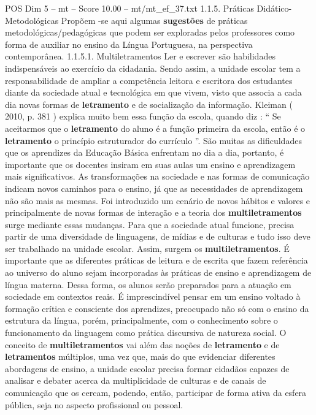 \begin{textsample}{POS Dim 5 – mt – Score 10.00 – mt/mt\_ef\_37.txt}  \label{ex:f5_pos_083}
1.1.5.
Práticas Didático-Metodológicas Propõem -se aqui algumas \textbf{sugestões} de práticas metodológicas/pedagógicas que podem ser exploradas pelos professores como forma de auxiliar no ensino da Língua Portuguesa, na perspectiva contemporânea. 1.1.5.1.
Multiletramentos Ler e escrever são habilidades indispensáveis ao exercício da cidadania.
Sendo assim, a unidade escolar tem a responsabilidade de ampliar a competência leitora e escritora dos estudantes diante da sociedade atual e tecnológica em que vivem, visto que associa a cada dia novas formas de \textbf{letramento} e de socialização da informação.
Kleiman ( 2010, p. 381 ) explica muito bem essa função da escola, quando diz : “ Se aceitarmos que o \textbf{letramento} do aluno é a função primeira da escola, então é o \textbf{letramento} o princípio estruturador do currículo ”.
São muitas as dificuldades que os aprendizes da Educação Básica enfrentam no dia a dia, portanto, é importante que os docentes insiram em suas aulas um ensino e aprendizagem mais significativos.
As transformações na sociedade e nas formas de comunicação indicam novos caminhos para o ensino, já que as necessidades de aprendizagem não são mais as mesmas.
Foi introduzido um cenário de novos hábitos e valores e principalmente de novas formas de interação e a teoria dos \textbf{multiletramentos} surge mediante essas mudanças.
Para que a sociedade atual funcione, precisa partir de uma diversidade de linguagens, de mídias e de culturas e tudo isso deve ser trabalhado na unidade escolar.
Assim, surgem os \textbf{multiletramentos}.
É importante que as diferentes práticas de leitura e de escrita que fazem referência ao universo do aluno sejam incorporadas às práticas de ensino e aprendizagem de língua materna.
Dessa forma, os alunos serão preparados para a atuação em sociedade em contextos reais.
É imprescindível pensar em um ensino voltado à formação crítica e consciente dos aprendizes, preocupado não só com o ensino da estrutura da língua, porém, principalmente, com o conhecimento sobre o funcionamento da linguagem como prática discursiva de natureza social.
O conceito de \textbf{multiletramentos} vai além das noções de \textbf{letramento} e de \textbf{letramentos} múltiplos, uma vez que, mais do que evidenciar diferentes abordagens de ensino, a unidade escolar precisa formar cidadãos capazes de analisar e debater acerca da multiplicidade de culturas e de canais de comunicação que os cercam, podendo, então, participar de forma ativa da esfera pública, seja no aspecto profissional ou pessoal.

\end{textsample}
